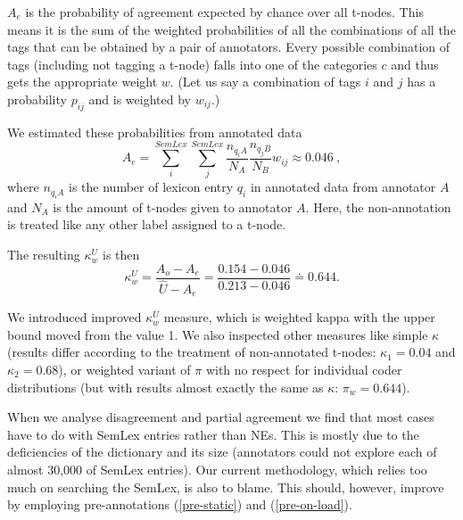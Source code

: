 $A_e$ is the probability of agreement expected by chance over all t-nodes. This means it is the sum of the weighted probabilities of all the combinations of all the tags that can be obtained by a pair of annotators. Every possible combination of tags (including not tagging a t-node) falls into one of the categories $c$ and thus gets the appropriate weight $w$. (Let us say a combination of tags $i$ and $j$ has a probability $p_{ij}$ and is weighted by $w_{ij}$.)
%

We estimated these probabilities from annotated data
\[
A_e = \sum_i^{SemLex} \sum_j^{SemLex}
	\frac{n_{q_iA}}{N_A} \frac{n_{q_jB}}{N_B} w_{ij} \approx 0.046\ ,
\]
where $n_{q_iA}$ is the number of lexicon entry $q_i$ in annotated data from annotator $A$ and $N_A$ is the amount of t-nodes given to annotator $A$. Here, the non-annotation is treated like any other label assigned to a t-node.

The resulting $\kappa_w^U$ is then
\[\kappa_w^U = \frac{A_o - A_e}{\widehat{U} - A_e} = \frac{0.154 - 0.046}{0.213 - 0.046} \doteq 0.644.\]

We introduced improved $\kappa_w^U$ measure, which is weighted kappa with the upper bound moved from the value 1. We also inspected other measures like simple $\kappa$ (results differ according to the treatment of non-annotated t-nodes: $\kappa_1 = 0.04$ and $\kappa_2 = 0.68$), or weighted variant of $\pi$ with no respect for individual coder distributions (but with results almost exactly the same as $\kappa$: $\pi_w = 0.644$).

When we analyse disagreement and partial agreement we find that most cases have to do with SemLex entries rather than NEs. This is mostly due to the deficiencies of the dictionary and its size (annotators could not explore each of almost 30,000 of SemLex entries). Our current methodology, which relies too much on searching the SemLex, is also to blame. This should, however, improve by employing pre-annotations (\ref{pre-static}) and (\ref{pre-on-load}). 

